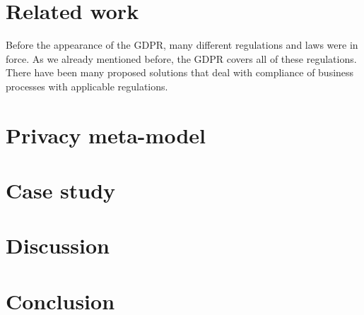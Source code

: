 \documentclass[11pt,english]{article}
\begin{document}
\section{Related work}
Before the appearance of the GDPR, many different regulations and laws were in force. As we already mentioned before, the GDPR covers all of these regulations.  There have been many proposed solutions that deal with compliance of business processes with applicable regulations.
\section{Privacy meta-model}
\section{Case study}
\section{Discussion}
\section{Conclusion}
\printbibliography
\end{document}
